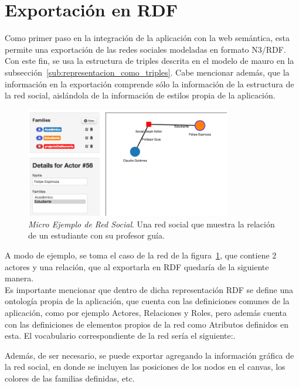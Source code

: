 \section{Exportación en RDF} %
\label{sec:exportacion_en_rdf}

Como primer paso en la integración de la aplicación con la web semántica, esta permite una exportación de las redes sociales modeladas en formato N3/RDF. Con este fin, se usa la estructura de triples descrita en el modelo de mauro en la subsección~\ref{sub:representacion_como_triples}. Cabe mencionar además, que la información en la exportación comprende sólo la información de la estructura de la red social, aislándola de la información de estilos propia de la aplicación.

\begin{figure}[H]
  \centering
  \includegraphics[width=0.8\textwidth]{images/mini_red_ejemplo.png}
  \caption[Micro Ejemplo de Red Social]{\emph{Micro Ejemplo de Red Social}. Una red social que muestra la relación de un estudiante con su profesor guía.}
  \label{mini_red_ejemplo}
\end{figure}

A modo de ejemplo, se toma el caso de la red de la figura~\ref{mini_red_ejemplo}, que contiene 2 actores y una relación, que al exportarla en RDF quedaría de la siguiente manera.\\



Es importante mencionar que dentro de dicha representación RDF se define una ontología propia de la aplicación, que cuenta con las definiciones comunes de la aplicación, como por ejemplo Actores, Relaciones y Roles, pero además cuenta con las definiciones de elementos propios de la red como Atributos definidos en esta. El vocabulario correspondiente de la red sería el siguiente:.


Además, de ser necesario, se puede exportar agregando la información gráfica de la red social, en donde se incluyen las posiciones de los nodos en el canvas, los colores de las familias definidas, etc.


% 
% 
% 
